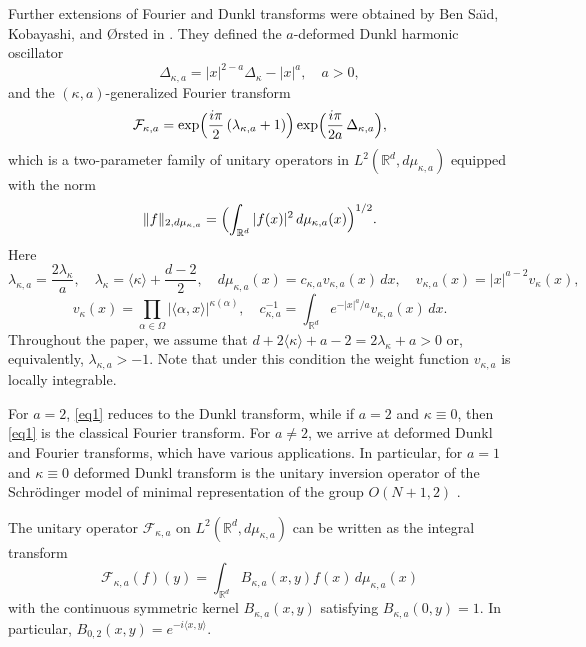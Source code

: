 \documentclass[12pt,twoside,reqno]{amsart}\usepackage[cp1251]{inputenc}
\theoremstyle{plain}
\theoremstyle{remark}
\begin{document}
Further extensions of Fourier and Dunkl transforms were obtained by Ben Sa\"{\i}d, Kobayashi, and {\O}rsted
in  \cite{SKO12}.
They defined the $a$-deformed Dunkl harmonic oscillator
\[
\Delta_{\kappa,a}=|x|^{2-a}\Delta_{\kappa}-|x|^{a},\quad a>0,
\]
and the  $(\kappa,a)$-generalized Fourier transform
\begin{equation}\label{eq1}
\mathcal{F}_{\kappa,a}=\exp\Bigl(\frac{i\pi}{2}\,(\lambda_{\kappa,a}+1)\Bigr)
\exp\Bigl(\frac{i\pi}{2a}\,\Delta_{\kappa,a}\Bigr),
\end{equation}
which is
a two-parameter family of unitary operators in $L^{2}(\mathbb{R}^{d},d\mu_{\kappa,a})$ equipped with the norm
\[
\|f\|_{2,d\mu_{\kappa,a}}=\Bigl(\int_{\mathbb{R}^{d}}|f(x)|^{2}\,d\mu_{\kappa,a}(x)\Bigr)^{1/2}.
\]
Here
\[
\lambda_{\kappa, a}=\frac{2\lambda_{\kappa}}{a},\quad \lambda_{\kappa}=\langle \kappa\rangle+\frac{d-2}{2},\quad
d\mu_{\kappa,a}(x)=c_{\kappa,a}v_{\kappa,a}(x)\,dx,\quad
v_{\kappa,a}(x)=|x|^{a-2}v_{\kappa}(x),
\]
\[
v_{\kappa}(x)=\prod_{\alpha\in \Omega}|\langle\alpha,x\rangle|^{\kappa(\alpha)},\quad
c^{-1}_{\kappa,a}=\int_{\mathbb{R}^{d}}e^{-|x|^{a}/a}v_{\kappa,a}(x)\,dx.
\]
Throughout the paper, we assume that   $%
d+2\langle \kappa\rangle+a-2=2\lambda_{\kappa}+a>0$
or, equivalently, $\lambda_{\kappa, a}>-1$. Note that under this condition the weight function $v_{\kappa,a}$ is locally integrable.

For  $a=2$,  \eqref{eq1} reduces to  the Dunkl transform, while if  $a=2$ and $\kappa\equiv 0$, then  \eqref{eq1} is the classical Fourier transform.
 For $a\ne 2$, we arrive at deformed Dunkl and %
  Fourier transforms, which have
 various applications. %
  In particular, for  $a=1$ and $\kappa\equiv 0$
 deformed Dunkl transform
is the unitary inversion operator of the Schr\"{o}dinger model of minimal
representation of the group $O(N+1,2)$ \cite{KM11}.

The  unitary operator  $\mathcal{F}_{\kappa,a}$ on
$L^{2}(\mathbb{R}^{d},d\mu_{\kappa,a})$ can be written as the integral
transform  \cite[(5.8)]{SKO12}
\begin{equation*}%
\mathcal{F}_{\kappa,a}(f)(y)=\int_{\mathbb{R}^{d}}B_{\kappa,a}(x,y)f(x)\,d\mu_{\kappa,a}(x)
\end{equation*}
with the continuous symmetric kernel  $B_{\kappa,a}(x,y)$ satisfying $B_{\kappa,a}(0,y)=1$. In particular,  $B_{0,2}(x,y)=e^{-i\langle x,y\rangle}$.
\end{document}

